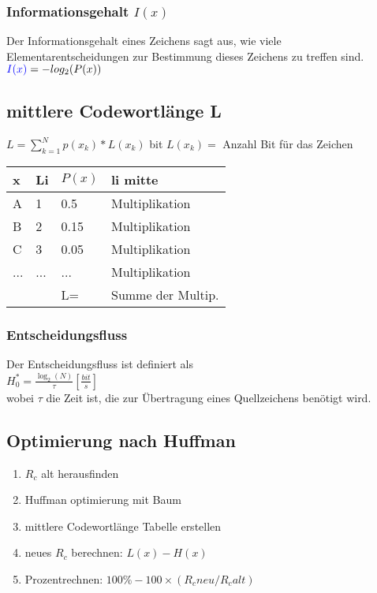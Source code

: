 \subsubsection{Informationsgehalt $I(x)$}
Der Informationsgehalt eines Zeichens sagt aus, wie viele Elementarentscheidungen zur Bestimmung dieses Zeichens zu treffen sind.
\colorbox{lightlightgrey}{$\textcolor{blue}{I(x)} = -log_2(P(x))$}


\subsection{mittlere Codewortlänge L}
\colorbox{lightlightgrey}{$L = \sum_{k = 1}^{N}p(x_k) * L(x_k)$ bit} $L(x_k) =$ Anzahl Bit für das Zeichen
\begin{center}
    \begin{tabular}{l | l | l | l}
        \hline
        x        &    Li    & $P(x)$     & li mitte\\ \hline
        A        &     1    & 0.5        &  Multiplikation\\
        B        &     2    & 0.15       &  Multiplikation\\
        C        &     3    & 0.05       &  Multiplikation\\
        ...      &   ...    & ...        &  Multiplikation\\
        \hline
        \hline
        &           &  L=     & Summe der Multip.\\
    \end{tabular}
\end{center}


\subsubsection{Entscheidungsfluss}
Der Entscheidungsfluss ist definiert als\\
\colorbox{lightlightgrey}{$H_{0}^{*}=\frac{\log _{2}(N)}{\tau}\left[\frac{b i t}{s}\right]$}\\
wobei $\tau$ die Zeit ist, die zur Übertragung eines Quellzeichens benötigt wird.




\subsection{Optimierung nach Huffman}
\begin{enumerate}
    \item $R_c$ alt herausfinden
    \item Huffman optimierung mit Baum
    \item mittlere Codewortlänge Tabelle erstellen
    \item neues $R_c$ berechnen: $L(x) - H(x)$
    \item Prozentrechnen: $100\% - 100 \times (R_c neu / R_c alt)$
\end{enumerate}

